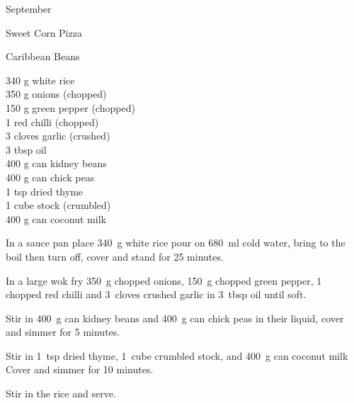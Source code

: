 \begin{menu}{September}
\begin{recipe}{2}{Sweet Corn Pizza}
\begin{instructions}
    \end{instructions}
    \end{recipe}%
  
    \begin{recipe}{2}{Caribbean Beans}%
		\begin{ingredients}
		340 g white rice  \\
	350 g onions (chopped) \\
	150 g green pepper (chopped) \\
	1  red chilli (chopped) \\
	3 cloves garlic (crushed) \\
	3 tbsp oil  \\
	400 g can kidney beans  \\
	400 g can chick peas  \\
	1 tsp dried thyme  \\
	1 cube stock (crumbled) \\
	400 g can coconut milk  \\
	
		\end{ingredients}
	
	
    \begin{instructions}
    \item 
    In a
    sauce pan
    place
    340~g  white rice
    pour on
    680~ml  cold water,
    bring to the boil then turn off, cover and stand for 25 minutes.
  \item 
        In a large wok fry
        350~g chopped onions,
        150~g chopped green pepper,
        1~ chopped red chilli
        and
        3~cloves crushed garlic
        in
        3~tbsp  oil
        until soft.
      \item 
        Stir in
        400~g  can kidney beans
        and
        400~g  can chick peas
        in their liquid,
        cover and simmer for 5 minutes.
      \item 
        Stir in
        1~tsp  dried thyme,
        1~cube crumbled stock,
        and
        400~g  can coconut milk
        Cover and simmer for 10 minutes.
      \item 
        Stir in the rice and serve.
      
    \end{instructions}
    \end{recipe}%
  

\end{menu}
